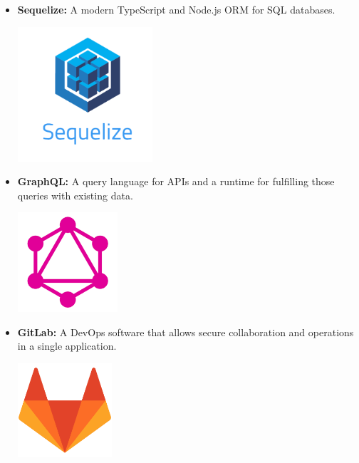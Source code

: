 \begin{itemize}
          \newpage
    \item \textbf{Sequelize:} \newline \cite{sequelize} A modern TypeScript and Node.js ORM for SQL databases. \newline
          \begin{minipage}{\linewidth}
              \centering
              \includegraphics[width=5cm]{src/assets/logos/sequelize_512x512.png}
          \end{minipage}
    \item \textbf{GraphQL:} \newline \cite{graphql} A query language for APIs and a runtime for fulfilling those queries with existing data. \newline
          \begin{minipage}{\linewidth}
              \centering
              \includegraphics[width=3.7cm]{src/assets/logos/graphql_512x512.png}
          \end{minipage}
    \item \textbf{GitLab:} \newline A DevOps software that allows secure collaboration and operations in a single application. \newline
          \begin{minipage}{\linewidth}
              \centering
              \includegraphics[width=3.5cm]{src/assets/logos/gitlab_512x512.png}
          \end{minipage}


\end{itemize}
